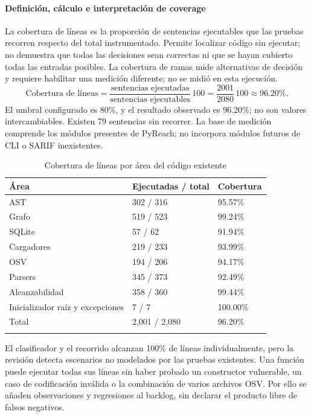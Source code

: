 \paragraph*{Definición, cálculo e interpretación de coverage}
La cobertura de líneas es la proporción de sentencias ejecutables que las pruebas recorren respecto del total instrumentado. Permite localizar código sin ejecutar; no demuestra que todas las decisiones sean correctas ni que se hayan cubierto todas las entradas posibles. La cobertura de ramas mide alternativas de decisión y requiere habilitar una medición diferente; no se midió en esta ejecución.
\[
\text{Cobertura de líneas}=\frac{\text{sentencias ejecutadas}}{\text{sentencias ejecutables}}\,100
=\frac{2001}{2080}\,100\approx96.20\%.
\]
El umbral configurado es 80\%, y el resultado observado es 96.20\%; no son valores intercambiables. Existen 79 sentencias sin recorrer. La base de medición comprende los módulos presentes de PyReach; no incorpora módulos futuros de CLI o SARIF inexistentes.
\begin{table}[H]
\centering\small{}
\caption{Cobertura de líneas por área del código existente}
\begin{tabularx}{\textwidth}{P{3cm}YY}
\toprule
\textbf{Área} & \textbf{Ejecutadas / total} & \textbf{Cobertura} \\
\midrule
AST & 302 / 316 & 95.57\% \\
\addlinespace
Grafo & 519 / 523 & 99.24\% \\
\addlinespace
SQLite & 57 / 62 & 91.94\% \\
\addlinespace
Cargadores & 219 / 233 & 93.99\% \\
\addlinespace
OSV & 194 / 206 & 94.17\% \\
\addlinespace
Parsers & 345 / 373 & 92.49\% \\
\addlinespace
Alcanzabilidad & 358 / 360 & 99.44\% \\
\addlinespace
Inicializador raíz y excepciones & 7 / 7 & 100.00\% \\
\addlinespace
Total & 2,001 / 2,080 & 96.20\% \\
\addlinespace
\bottomrule
\end{tabularx}
\end{table}
El clasificador y el recorrido alcanzan 100\% de líneas individualmente, pero la revisión detecta escenarios no modelados por las pruebas existentes. Una función puede ejecutar todas sus líneas sin haber probado un constructor vulnerable, un caso de codificación inválida o la combinación de varios archivos OSV. Por ello se añaden observaciones y regresiones al backlog, sin declarar el producto libre de falsos negativos.

